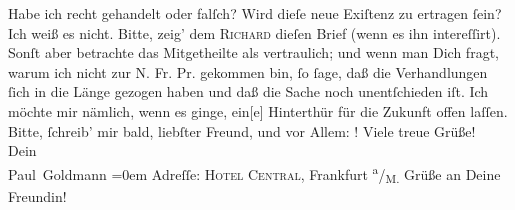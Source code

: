 \begin{ledgroupsized}[t]{13cm}
           \pstart
           Habe ich recht gehandelt oder falſch? Wird  dieſe neue Exiſtenz zu
               ertragen ſein? Ich weiß es nicht.\pend
           \pstart
           Bitte, zeig’ dem \textsc{Richard} dieſen Brief (wenn es ihn intereſſirt). Sonſt aber betrachte das Mitgetheilte
               als vertraulich; und wenn man  Dich fragt, warum ich
               nicht zur N. Fr. Pr. gekommen bin, ſo  ſage, daß die Verhandlungen
               ſich in die Länge gezogen haben und daß die Sache noch unentſchieden iſt. Ich möchte
               mir nämlich, wenn es ginge, ein{[}e{]} Hinterthür für die Zukunft
               offen laſſen.\pend
           \pstart
           Bitte, ſchreib’ mir bald, liebſter Freund, und vor Allem: \label{K_L02868-10v}\label{K_L02868-10h}!\pend
           \pstart
           Viele treue Grüße! {\\[\baselineskip]}Dein {\\[\baselineskip]}\spacefill\mbox{Paul Goldmann}\pend
           \leftskip=0em{}\pstart
           \noindent{}Adreſſe: \textsc{Hotel Central}, Frankfurt \textsuperscript{a}/\textsubscript{M.}\pend
           \pstart
           Grüße an Deine Freundin!\pend
           
         
         \endnumbering{}\end{ledgroupsized}  \newcommand{\dateiname}{L02868}\newcommand{\titel}{Paul Goldmann an Arthur Schnitzler, 5. 3. [1899]}\newcommand{\editorInnen}{Martin Anton Müller und Laura Untner}
      